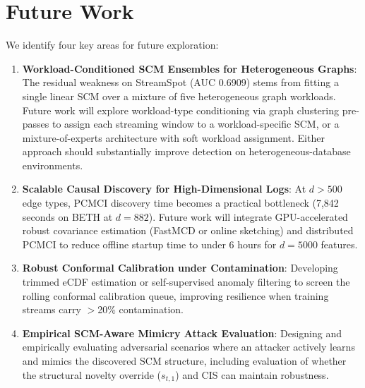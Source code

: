 \section{Future Work}
\label{sec:future}
We identify four key areas for future exploration:
\begin{enumerate}
\item \textbf{Workload-Conditioned SCM Ensembles for Heterogeneous Graphs}: The residual weakness on StreamSpot (AUC 0.6909) stems from fitting a single linear SCM over a mixture of five heterogeneous graph workloads. Future work will explore workload-type conditioning via graph clustering pre-passes to assign each streaming window to a workload-specific SCM, or a mixture-of-experts architecture with soft workload assignment. Either approach should substantially improve detection on heterogeneous-database environments.
\item \textbf{Scalable Causal Discovery for High-Dimensional Logs}: At $d > 500$ edge types, PCMCI discovery time becomes a practical bottleneck (7,842 seconds on BETH at $d = 882$). Future work will integrate GPU-accelerated robust covariance estimation (FastMCD or online sketching) and distributed PCMCI to reduce offline startup time to under 6 hours for $d = 5000$ features.
\item \textbf{Robust Conformal Calibration under Contamination}: Developing trimmed eCDF estimation or self-supervised anomaly filtering to screen the rolling conformal calibration queue, improving resilience when training streams carry $>$20\% contamination.
\item \textbf{Empirical SCM-Aware Mimicry Attack Evaluation}: Designing and empirically evaluating adversarial scenarios where an attacker actively learns and mimics the discovered SCM structure, including evaluation of whether the structural novelty override ($s_{t,1}$) and CIS can maintain robustness.
\end{enumerate}
